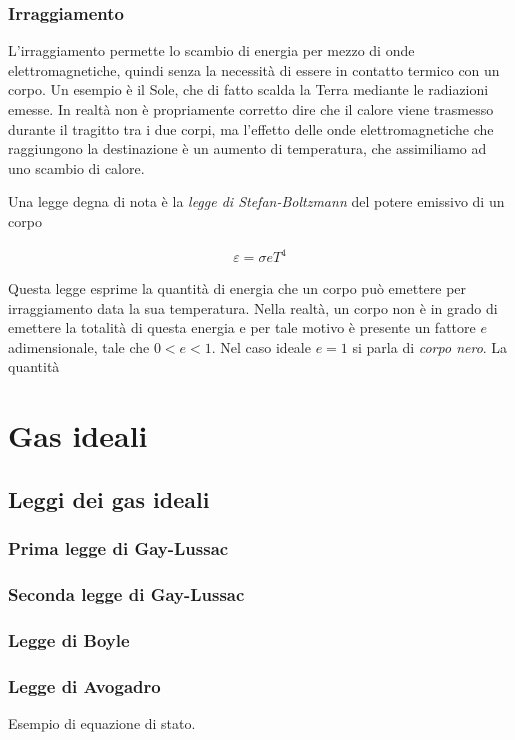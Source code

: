 \subsubsection{Irraggiamento}
L'irraggiamento permette lo scambio di energia per mezzo di onde
elettromagnetiche, quindi senza la necessità di essere in contatto
termico con un corpo. Un esempio è il Sole, che di fatto scalda la
Terra mediante le radiazioni emesse. In realtà non è propriamente
corretto dire che il calore viene trasmesso durante il tragitto tra
i due corpi, ma l'effetto delle onde elettromagnetiche che raggiungono
la destinazione è un aumento di temperatura, che assimiliamo ad uno
scambio di calore.

Una legge degna di nota è la \textit{legge di Stefan-Boltzmann} del
potere emissivo di un corpo

\begin{align}
    \varepsilon = \sigma e T^4
\end{align}

\noindent Questa legge esprime la quantità di energia che un corpo
può emettere per irraggiamento data la sua temperatura. Nella realtà,
un corpo non è in grado di emettere la totalità di questa energia
e per tale motivo è presente un fattore $e$ adimensionale, tale che
$0 < e < 1$. Nel caso ideale $e = 1$ si parla di \textit{corpo nero}.
La quantità

\section{Gas ideali}

\subsection{Leggi dei gas ideali}

\subsubsection*{Prima legge di Gay-Lussac}
\subsubsection*{Seconda legge di Gay-Lussac}
\subsubsection*{Legge di Boyle}

\subsubsection*{Legge di Avogadro}
Esempio di equazione di stato.

